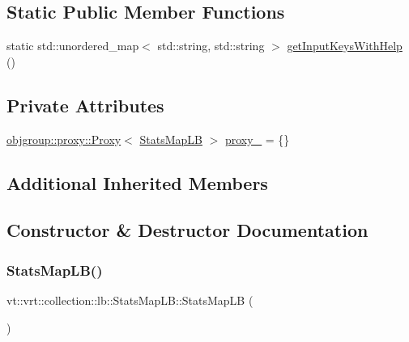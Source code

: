 \subsection*{Static Public Member Functions}
\begin{DoxyCompactItemize}
\item 
static std\+::unordered\+\_\+map$<$ std\+::string, std\+::string $>$ \hyperlink{structvt_1_1vrt_1_1collection_1_1lb_1_1_stats_map_l_b_ab795f35642e78ff8b01cdd7440a053e2}{get\+Input\+Keys\+With\+Help} ()
\end{DoxyCompactItemize}
\subsection*{Private Attributes}
\begin{DoxyCompactItemize}
\item 
\hyperlink{structvt_1_1objgroup_1_1proxy_1_1_proxy}{objgroup\+::proxy\+::\+Proxy}$<$ \hyperlink{structvt_1_1vrt_1_1collection_1_1lb_1_1_stats_map_l_b}{Stats\+Map\+LB} $>$ \hyperlink{structvt_1_1vrt_1_1collection_1_1lb_1_1_stats_map_l_b_a184d157fdde8798ec9ed79a2f4238816}{proxy\+\_\+} = \{\}
\end{DoxyCompactItemize}
\subsection*{Additional Inherited Members}


\subsection{Constructor \& Destructor Documentation}
\mbox{\label{structvt_1_1vrt_1_1collection_1_1lb_1_1_stats_map_l_b_ae854ea50c2de3fadee41292343301b6d}} 
\subsubsection{\texorpdfstring{Stats\+Map\+L\+B()}{StatsMapLB()}\hspace{0.1cm}{\footnotesize\ttfamily [1/3]}}
{\footnotesize\ttfamily vt\+::vrt\+::collection\+::lb\+::\+Stats\+Map\+L\+B\+::\+Stats\+Map\+LB (\begin{DoxyParamCaption}{ }\end{DoxyParamCaption})\hspace{0.3cm}{\ttfamily [default]}}


